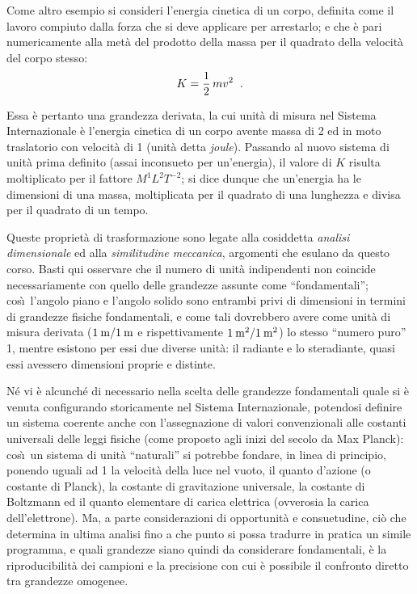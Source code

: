 Come altro esempio si consideri l'energia cinetica di un
corpo, definita come il lavoro compiuto dalla forza che si
deve applicare per arrestarlo; e che \`e pari numericamente
alla met\`a del prodotto della massa per il quadrato della
velocit\`a del corpo stesso:
\begin{equation*}
  K = \frac{1}{2} \, m v^2 \;\; .
\end{equation*}

Essa \`e pertanto una grandezza derivata, la cui unit\`a di
misura nel Sistema Internazionale \`e l'energia cinetica di
un corpo avente massa di 2 ed in moto traslatorio con
velocit\`a di 1 (unit\`a detta \emph{joule}).
Passando al nuovo sistema di unit\`a prima definito (assai
inconsueto per un'energia), il valore di $K$ risulta
moltiplicato per il fattore $M^1 L^2 T^{-2}$; si dice dunque
che un'energia ha le dimensioni di una massa, moltiplicata
per il quadrato di una lunghezza e divisa per il quadrato di
un tempo.

Queste propriet\`a di trasformazione sono legate alla
cosiddetta \emph{analisi dimensionale} ed alla
\emph{similitudine meccanica}, argomenti che esulano da
questo corso.%
Basti qui osservare che il numero di unit\`a indipendenti
non coincide necessariamente con quello delle grandezze
assunte come ``fondamentali''; cos\`\i\ l'angolo piano e
l'angolo solido sono entrambi privi di dimensioni in termini
di grandezze fisiche fondamentali, e come tali dovrebbero
avere come unit\`a di misura derivata ($1\un{m} / 1\un{m}$ e
rispettivamente $1\un{m^2} / 1\un{m^2}$) lo stesso ``numero
puro'' 1, mentre esistono per essi due diverse unit\`a: il
radiante e lo steradiante, quasi essi avessero dimensioni
proprie e distinte.

N\'e vi \`e alcunch\'e di necessario nella scelta delle
grandezze fondamentali quale si \`e venuta configurando
storicamente nel Sistema Internazionale, potendosi definire
un sistema coerente anche con l'assegnazione di valori
convenzionali alle costanti universali delle leggi fisiche
(come proposto agli inizi del secolo da
Max Planck):%
cos\`\i\ un sistema di unit\`a ``naturali''%
si potrebbe fondare, in linea di principio, ponendo uguali
ad 1 la velocit\`a della luce nel vuoto, il quanto d'azione
(o costante di Planck), la costante di gravitazione
universale, la costante di Boltzmann ed il quanto elementare
di carica elettrica (ovverosia la carica dell'elettrone).
Ma, a parte considerazioni di opportunit\`a e consuetudine,
ci\`o che determina in ultima analisi fino a che punto si
possa tradurre in pratica un simile programma, e quali
grandezze siano quindi da considerare fondamentali, \`e la
riproducibilit\`a dei campioni e la precisione con cui \`e
possibile il confronto diretto tra grandezze omogenee.

